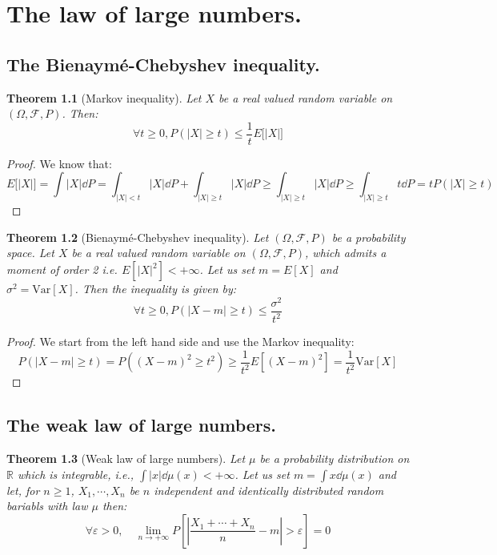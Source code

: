 \documentclass[10pt,a4paper]{book}
\newtheorem{theorem}{Theorem}[section]
\theoremstyle{definition}
\begin{document}
\chapter{The law of large numbers.}

\section{The Bienaymé-Chebyshev inequality.}

\begin{theorem}[Markov inequality]
Let $X$ be a real valued random variable on $(\Omega, \mathcal{F}, P)$. Then:
\[
\forall t \geq 0, P(|X| \geq t) \leq \frac{1}{t} E\big[|X|\big]
\]
\end{theorem}

\begin{proof}

We know that:
\[
E\big[|X|\big] = \int |X| \dd P = \int_{|X| < t} |X| \dd P + \int_{|X| \geq t} |X| \dd P \geq \int_{|X| \geq t} |X| \dd P \geq \int_{|X| \geq t} t \dd P = t P(|X| \geq t)
\]

\end{proof}

\begin{theorem}[Bienaymé-Chebyshev inequality]
Let $(\Omega, \mathcal{F}, P)$ be a probability space. Let $X$ be a real valued random variable on $(\Omega, \mathcal{F}, P)$, which admits a moment of order 2 i.e. $E[|X|^2] < +\infty$. Let us set $m = E[X]$ and $\sigma^2 = \text{Var}[X]$. Then the inequality is given by:
\[
\forall t \geq 0, P(|X - m| \geq t) \leq \frac{\sigma^2}{t^2}
\]
\end{theorem}

\begin{proof}
We start from the left hand side and use the Markov inequality:
\[
P(|X - m| \geq t) = P\left( (X - m)^2 \geq t^2 \right) \geq \frac{1}{t^2} E\left[ (X - m)^2 \right] = \frac{1}{t^2} \text{Var}[X]
\]
\end{proof}

\section{The weak law of large numbers.}

\begin{theorem}[Weak law of large numbers]
Let $\mu$ be a probability distribution on $\mathbb{R}$ which is integrable, i.e., $\int |x| \dd \mu(x) < +\infty$. Let us set $m = \int x \dd \mu(x)$ and let, for $n \geq 1$, $X_1, \cdots, X_n$ be $n$ independent and identically distributed random bariabls with law $\mu$ then:
\[
\forall \varepsilon > 0, \quad \lim_{n \to +\infty} P\left[ \left|\frac{X_1 + \cdots + X_n}{n} - m \right| > \varepsilon \right] = 0
\]
\end{theorem}
\end{document}
